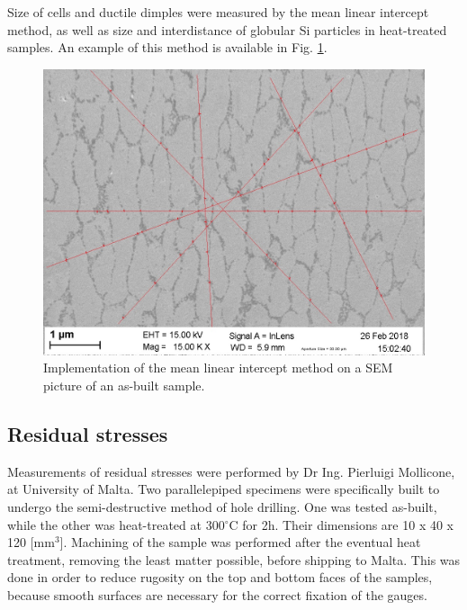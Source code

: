 Size of cells and ductile dimples were measured by the mean linear intercept method, as well as size and interdistance of globular Si particles in heat-treated samples. An example of this method is available in Fig. \ref{fig:mm_sem}.

\begin{figure}[h]
	\centering
	\centerline{\includegraphics[scale=0.50]{Images/SEM-7b-7}}
	\decoRule
	\caption[Implementation of the mean linear intercept method on a SEM picture of an as-built sample.]{Implementation of the mean linear intercept method on a SEM picture of an as-built sample.}
	\label{fig:mm_sem}
\end{figure}

\subsection{Residual stresses}

Measurements of residual stresses were performed by Dr Ing. Pierluigi Mollicone, at University of Malta. Two parallelepiped specimens were specifically built to undergo the semi-destructive method of hole drilling. One was tested as-built, while the other was heat-treated at 300$^\circ$C for 2h. Their dimensions are 10 x 40 x 120 [mm$^3$]. Machining of the sample was performed after the eventual heat treatment, removing the least matter possible, before shipping to Malta. This was done in order to reduce rugosity on the top and bottom faces of the samples, because smooth surfaces are necessary for the correct fixation of the gauges. \\

